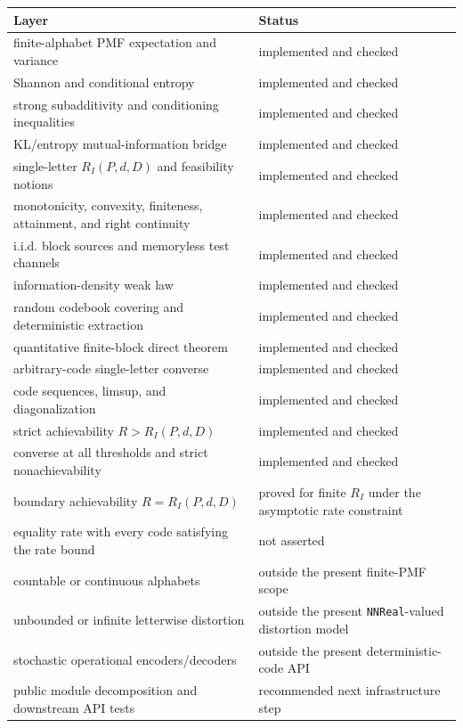 \documentclass[11pt]{article}
\newcommand{\RD}{R_I}
\begin{document}
\begin{longtable}{>{\raggedright\arraybackslash}p{}
                  >{\raggedright\arraybackslash}p{}}
\toprule
Layer & Status \\
\midrule
\endhead
finite-alphabet PMF expectation and variance & implemented and checked \\
Shannon and conditional entropy & implemented and checked \\
strong subadditivity and conditioning inequalities & implemented and checked \\
KL/entropy mutual-information bridge & implemented and checked \\
single-letter $\RD(P,d,D)$ and feasibility notions & implemented and checked \\
monotonicity, convexity, finiteness, attainment, and right continuity & implemented and checked \\
i.i.d. block sources and memoryless test channels & implemented and checked \\
information-density weak law & implemented and checked \\
random codebook covering and deterministic extraction & implemented and checked \\
quantitative finite-block direct theorem & implemented and checked \\
arbitrary-code single-letter converse & implemented and checked \\
code sequences, limsup, and diagonalization & implemented and checked \\
strict achievability $R>\RD(P,d,D)$ & implemented and checked \\
converse at all thresholds and strict nonachievability & implemented and checked \\
boundary achievability $R=\RD(P,d,D)$ & proved for finite $\RD$ under the asymptotic rate constraint \\
equality rate with every code satisfying the rate bound & not asserted \\
countable or continuous alphabets & outside the present finite-PMF scope \\
unbounded or infinite letterwise distortion & outside the present
\texttt{NNReal}-valued distortion model \\
stochastic operational encoders/decoders & outside the present deterministic-code API \\
public module decomposition and downstream API tests & recommended next infrastructure step \\
\bottomrule
\end{longtable}
\end{document}
